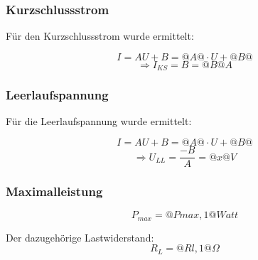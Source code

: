 \documentclass{article}
\begin{document}






\subsubsection{Kurzschlussstrom}

Für den Kurzschlussstrom wurde ermittelt: 

$$I=AU+B=@A@\cdot U + @B@$$
$$\Rightarrow I_{KS}=B=@B@A$$


\subsubsection{Leerlaufspannung}

Für die Leerlaufspannung wurde ermittelt: 

$$I=AU+B=@A@\cdot U + @B@$$
$$\Rightarrow U_{LL}=\frac{-B}{A}=@x@V$$
 
\subsubsection{Maximalleistung}


$$P_{max}=@Pmax,1@Watt$$

Der dazugehörige Lastwiderstand: $$R_{L}=@Rl,1@ \Omega$$
\end{document}
